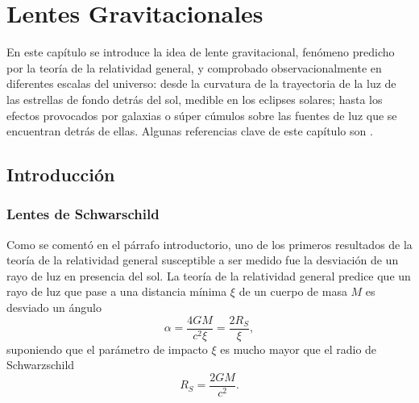 \chapter{Lentes Gravitacionales}
En este capítulo se introduce la idea de lente gravitacional, fenómeno predicho por la teoría de la relatividad general, y comprobado observacionalmente en diferentes escalas del universo: desde la curvatura de la trayectoria de la luz de las estrellas de fondo detrás del sol, medible en los eclipses solares; hasta los efectos provocados por galaxias o súper cúmulos sobre las fuentes de luz que se encuentran detrás de ellas. Algunas referencias clave de este capítulo son \cite{schneider_ehlers_falco_1992,weinberg_2016, castaneda, Giovi_2001}.
\section{Introducción}
\subsection{Lentes de Schwarschild}
Como se comentó en el párrafo introductorio, uno de los primeros resultados de la teoría de la relatividad general susceptible a ser medido fue la desviación de un rayo de luz en presencia del sol. La teoría de la relatividad general predice que un rayo de luz que pase a una distancia mínima $\xi$ de un cuerpo de masa $M$ es desviado un ángulo
\begin{equation}\label{deflection}
	\alpha=\frac{4GM}{c^2\xi}=\frac{2R_S}{\xi},
\end{equation}
suponiendo que el parámetro de impacto $\xi$ es mucho mayor que el radio de Schwarzschild \cite{weinberg_2016}
\begin{equation}
	R_S=\frac{2GM}{c^2}.
\end{equation}

